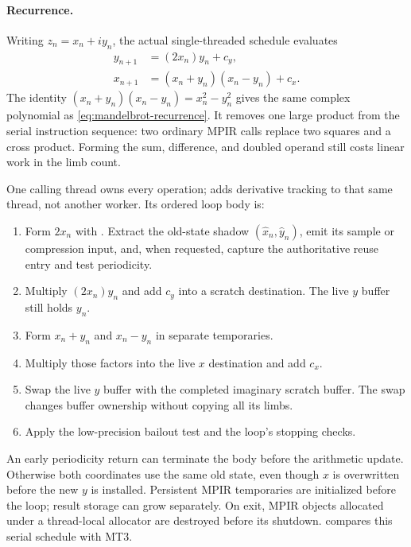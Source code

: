 \paragraph{Recurrence.}
Writing \(z_n = x_n + i y_n\), the actual single-threaded schedule evaluates
\begin{align}
  y_{n+1} &= (2x_n)y_n + c_y, \label{eq:st-recurrence-imag} \\
  x_{n+1} &= (x_n+y_n)(x_n-y_n) + c_x. \label{eq:st-recurrence-real}
\end{align}
The identity $(x_n+y_n)(x_n-y_n)=x_n^2-y_n^2$ gives the same complex
polynomial as \eqref{eq:mandelbrot-recurrence}. It removes one large product
from the serial instruction sequence: two ordinary MPIR 
calls replace two squares and a cross product. Forming the sum, difference,
and doubled operand still costs linear work in the limb count.

One calling thread owns every operation;  adds derivative
tracking to that same thread, not another worker. Its ordered loop body is:
\begin{enumerate}
  \item Form $2x_n$ with . Extract the old-state shadow
        $(\hat{x}_n,\hat{y}_n)$, emit its sample or compression input, and,
        when requested, capture the authoritative reuse entry and test periodicity.
  \item Multiply $(2x_n)y_n$ and add $c_y$ into a scratch destination.
        The live $y$ buffer still holds $y_n$.
  \item Form $x_n+y_n$ and $x_n-y_n$ in separate temporaries.
  \item Multiply those factors into the live $x$ destination and add $c_x$.
  \item Swap the live $y$ buffer with the completed imaginary scratch buffer.
        The swap changes buffer ownership without copying all its limbs.
  \item Apply the low-precision bailout test and the loop's stopping checks.
\end{enumerate}
An early periodicity return can terminate the body before the arithmetic update.
Otherwise both coordinates use the same old state, even though $x$ is overwritten
before the new $y$ is installed. Persistent MPIR temporaries are initialized
before the loop; result storage can grow separately. On exit, MPIR objects
allocated under a thread-local allocator are destroyed before its shutdown.
 compares this serial schedule with MT3.

